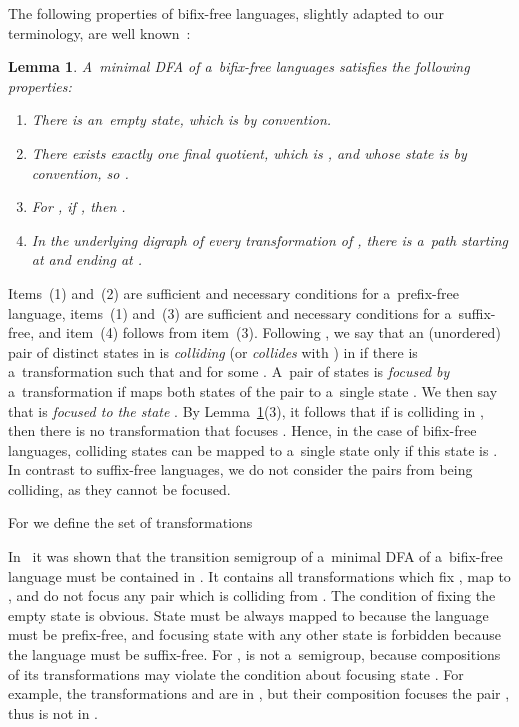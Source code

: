 \documentclass{amsart}
\newtheorem{lemma}[theorem]{Lemma}
\begin{document}
The following properties of bifix-free languages, slightly adapted to our terminology, are well known~\cite{BLY12}:
\begin{lemma}\label{lem:bifix-free}
A~minimal DFA  of a~bifix-free languages  satisfies the following properties:
\begin{enumerate}
\item There is an~empty state, which is  by convention.
\item There exists exactly one final quotient, which is , and whose state is  by convention, so .
\item For , if , then .
\item In the underlying digraph of every transformation of , there is a~path starting at  and ending at .
\end{enumerate}
\end{lemma}
Items~(1) and~(2) are sufficient and necessary conditions for a~prefix-free language, items~(1) and~(3) are sufficient and necessary conditions for a~suffix-free, and item~(4) follows from item~(3).
Following \cite{BrSz15SyntacticComplexityOfSuffixFree}, we say that an (unordered) pair  of distinct states in  is \emph{colliding} (or  \emph{collides} with ) in  if there is a~transformation  such that  and  for some .
A~pair of states is \emph{focused by} a~transformation  if  maps both states of the pair to a~single state .
We then say that  is \emph{focused to the state }.
By Lemma~\ref{lem:bifix-free}(3), it follows that if  is colliding in , then there is no transformation  that focuses .
Hence, in the case of bifix-free languages, colliding states can be mapped to a~single state only if this state is .
In contrast to suffix-free languages, we do not consider the pairs from  being colliding, as they cannot be focused.

For  we define the set of transformations

In~\cite{BLY12} it was shown that the transition semigroup  of a~minimal DFA of a~bifix-free
language must be contained in .
It contains all transformations  which fix , map  to , and do not focus any
pair which is colliding from .
The condition of fixing the empty state  is obvious. State  must be always mapped to  because the language must be prefix-free, and focusing state  with any other state is forbidden because the language must be suffix-free.
For ,  is not a~semigroup, because compositions of its transformations may violate the condition about focusing state .
For example, the transformations  and  are in , but their composition  focuses the pair , thus is not in .
\end{document}
